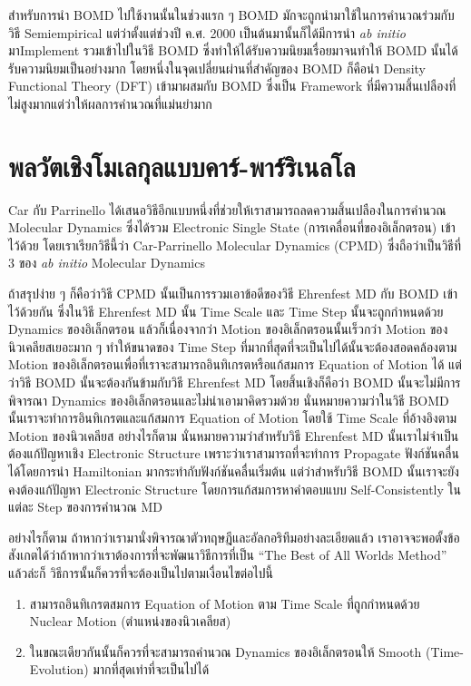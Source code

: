 สำหรับการนำ BOMD ไปใช้งานนั้นในช่วงแรก ๆ BOMD มักจะถูกนำมาใช้ในการคำนวณร่วมกับวิธี Semiempirical แต่ว่าตั้งแต่ช่วงปี ค.ศ. 2000
เป็นต้นมานั้นก็ได้มีการนำ \textit{ab initio} มาImplement รวมเข้าไปในวิธี BOMD ซึ่งทำให้ได้รับความนิยมเรื่อยมาจนทำให้ BOMD
นั้นได้รับความนิยมเป็นอย่างมาก โดยหนึ่งในจุดเปลี่ยนผ่านที่สำคัญของ BOMD ก็คือนำ Density Functional Theory (DFT) เข้ามาผสมกับ BOMD
ซึ่งเป็น Framework ที่มีความสิ้นเปลืองที่ไม่สูงมากแต่ว่าให้ผลการคำนวณที่แม่นยำมาก

\section{พลวัตเชิงโมเลกุลแบบคาร์-พาร์ริเนลโล}

Car กับ Parrinello ได้เสนอวิธีอีกแบบหนึ่งที่ช่วยให้เราสามารถลดความสิ้นเปลืองในการคำนวณ Molecular Dynamics ซึ่งได้รวม Electronic
Single State (การเคลื่อนที่ของอิเล็กตรอน) เข้าไว้ด้วย โดยเราเรียกวิธีนี้ว่า Car-Parrinello Molecular Dynamics (CPMD) ซึ่งถือว่าเป็นวิธีที่
3 ของ \textit{ab initio} Molecular Dynamics

ถ้าสรุปง่าย ๆ ก็คือว่าวิธี CPMD นั้นเป็นการรวมเอาข้อดีของวิธี Ehrenfest MD กับ BOMD เข้าไว้ด้วยกัน ซึ่งในวิธี Ehrenfest MD นั้น Time Scale
และ Time Step นั้นจะถูกกำหนดด้วย Dynamics ของอิเล็กตรอน แล้วก็เนื่องจากว่า Motion ของอิเล็กตรอนนั้นเร็วกว่า Motion ของนิวเคลียสเยอะมาก ๆ
ทำให้ขนาดของ Time Step ที่มากที่สุดที่จะเป็นไปได้นั้นจะต้องสอดคล้องตาม Motion ของอิเล็กตรอนเพื่อที่เราจะสามารถอินทิเกรตหรือแก้สมการ
Equation of Motion ได้ แต่ว่าวิธี BOMD นั้นจะต้องกันข้ามกับวิธี Ehrenfest MD โดยสิ้นเชิงก็คือว่า BOMD นั้นจะไม่มีการพิจารณา Dynamics
ของอิเล็กตรอนและไม่นำเอามาคิดรวมด้วย นั่นหมายความว่าในวิธี BOMD นั้นเราจะทำการอินทิเกรตและแก้สมการ Equation of Motion โดยใช้
Time Scale ที่อ้างอิงตาม Motion ของนิวเคลียส อย่างไรก็ตาม นั่นหมายความว่าสำหรับวิธี Ehrenfest MD นั้นเราไม่จำเป็นต้องแก้ปัญหาเชิง
Electronic Structure เพราะว่าเราสามารถที่จะทำการ Propagate ฟังก์ชันคลื่นได้โดยการนำ Hamiltonian มากระทำกับฟังก์ชันคลื่นเริ่มต้น
แต่ว่าสำหรับวิธี BOMD นั้นเราจะยังคงต้องแก้ปัญหา Electronic Structure โดยการแก้สมการหาคำตอบแบบ Self-Consistently ในแต่ละ Step
ของการคำนวณ MD

อย่างไรก็ตาม ถ้าหากว่าเรามานั่งพิจารณาตัวทฤษฎีและอัลกอริทึมอย่างละเอียดแล้ว เราอาจจะพอตั้งข้อสังเกตได้ว่าถ้าหากว่าเราต้องการที่จะพัฒนาวิธีการที่เป็น
\enquote{The Best of All Worlds Method} แล้วล่ะก็ วิธีการนั้นก็ควรที่จะต้องเป็นไปตามเงื่อนไขต่อไปนี้

\begin{enumerate}[topsep=0pt,noitemsep]
  \setlength\itemsep{0.5em}
  \item สามารถอินทิเกรตสมการ Equation of Motion ตาม Time Scale ที่ถูกกำหนดด้วย Nuclear Motion (ตำแหน่งของนิวเคลียส)

  \item ในขณะเดียวกันนั้นก็ควรที่จะสามารถคำนวณ Dynamics ของอิเล็กตรอนให้ Smooth (Time-Evolution) มากที่สุดเท่าที่จะเป็นไปได้
\end{enumerate}

